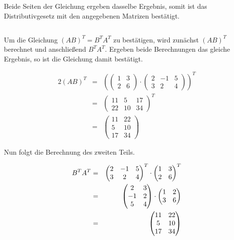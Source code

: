 \documentclass[10pt,a4paper,oneside,ngerman,numbers=noenddot]{scrartcl}
\begin{document}
Beide Seiten der Gleichung ergeben dasselbe Ergebnis, somit ist das Distributivgesetz mit den angegebenen Matrizen bestätigt.

\subsection{} %
Um die Gleichung $(AB)^{T} = B^{T}A^{T}$ zu bestätigen, wird zunächst $(AB)^{T}$ berechnet und anschließend $B^{T}A^{T}$. Ergeben beide Berechnungen das gleiche Ergebnis, so ist die Gleichung damit bestätigt.

\begin{alignat*}{2}
(AB)^{T} &=& \left( \begin{pmatrix} 1 & 3 \\ 2 & 6 \end{pmatrix} \cdot \begin{pmatrix} 2 & -1 & 5 \\ 3 & 2 & 4 \end{pmatrix} \right)^{T} \\
&=& \begin{pmatrix} 11 & 5 & 17 \\ 22 & 10 & 34 \end{pmatrix}^{T} \\
&=& \begin{pmatrix} 11 & 22 \\ 5 & 10 \\ 17 & 34 \end{pmatrix}
\end{alignat*}

Nun folgt die Berechnung des zweiten Teils.

\begin{alignat}{2}
B^{T}A^{T} &=& \begin{pmatrix} 2 & -1 & 5 \\ 3 & 2 & 4 \end{pmatrix}^{T} \cdot \begin{pmatrix} 1 & 3 \\ 2 & 6 \end{pmatrix}^{T} \notag\\
&=& \begin{pmatrix} 2 & 3 \\ -1 & 2 \\ 5 & 4 \end{pmatrix} \cdot \begin{pmatrix} 1 & 2 \\ 3 & 6 \end{pmatrix} \label{eq:transponiert} \\
&=& \begin{pmatrix} 11 & 22 \\ 5 & 10 \\ 17 & 34 \end{pmatrix} \notag
\end{alignat}
\end{document}
